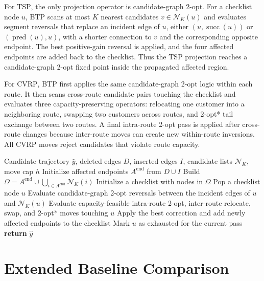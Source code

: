 \documentclass[11pt]{article}
\newcommand{\TSP}{\textsc{TSP}}
\newcommand{\CVRP}{\textsc{CVRP}}
\newcommand{\BTP}{\textsc{BTP}}
\newcommand{\cN}{\mathcal{N}}
\begin{document}
For \TSP{}, the only projection operator is candidate-graph 2-opt. For a checklist node $u$, \BTP{} scans at most $K$ nearest candidates $v\in\cN_K(u)$ and evaluates segment reversals that replace an incident edge of $u$, either $(u,\operatorname{succ}(u))$ or $(\operatorname{pred}(u),u)$, with a shorter connection to $v$ and the corresponding opposite endpoint. The best positive-gain reversal is applied, and the four affected endpoints are added back to the checklist. Thus the \TSP{} projection reaches a candidate-graph 2-opt fixed point inside the propagated affected region.

For \CVRP{}, \BTP{} first applies the same candidate-graph 2-opt logic within each route. It then scans cross-route candidate pairs touching the checklist and evaluates three capacity-preserving operators: relocating one customer into a neighboring route, swapping two customers across routes, and 2-opt* tail exchange between two routes. A final intra-route 2-opt pass is applied after cross-route changes because inter-route moves can create new within-route inversions. All \CVRP{} moves reject candidates that violate route capacity.

\begin{algorithm}[h]
\caption{\BTP{} for autoregressive transitions.}
\label{alg:btp}
\small
\begin{algorithmic}[1]
\REQUIRE Candidate trajectory $\hat y$, deleted edges $D$, inserted edges $I$, candidate lists $\cN_K$, move cap $h$
\STATE Initialize affected endpoints $A^{\mathrm{end}}$ from $D\cup I$
\STATE Build $\Omega=A^{\mathrm{end}}\cup\bigcup_{i\in A^{\mathrm{end}}}\cN_K(i)$
\STATE Initialize a checklist with nodes in $\Omega$
    \STATE Pop a checklist node $u$
    \IF{the instance is \TSP{}}
        \STATE Evaluate candidate-graph 2-opt reversals between the incident edges of $u$ and $\cN_K(u)$
    \ELSE
        \STATE Evaluate capacity-feasible intra-route 2-opt, inter-route relocate, swap, and 2-opt* moves touching $u$
    \ENDIF
        \STATE Apply the best correction and add newly affected endpoints to the checklist
    \ELSE
        \STATE Mark $u$ as exhausted for the current pass
    \ENDIF
\ENDWHILE
\STATE \textbf{return} $\hat y$
\end{algorithmic}
\end{algorithm}

\section{Extended Baseline Comparison}
\label{app:large-comparison}
\end{document}
